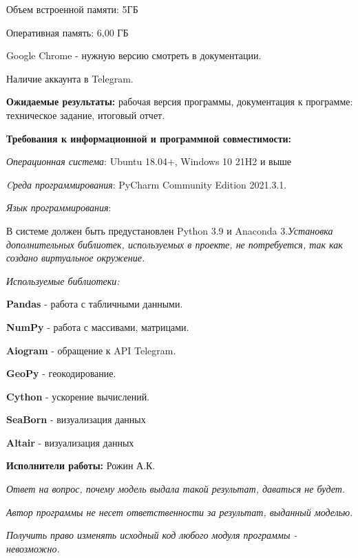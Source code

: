 \documentclass[a4paper,12pt]{article}
\begin{document}
	Объем встроенной памяти: 5ГБ
	
	Оперативная память: 6,00 ГБ
	
	Google Chrome - нужную версию смотреть в документации.
	
	Наличие аккаунта в Telegram.
	
	
	\vspace{5ex}
	\textbf{Ожидаемые результаты:}
	рабочая версия программы, документация к
	программе: техническое задание, итоговый отчет.
	
	\vspace{5ex}
	\textbf{Требования к информационной и программной совместимости:}
	
	\vspace{2ex}
	\textit{Операционная система}: Ubuntu 18.04+, Windows 10 21H2 и выше
	
	\vspace{2ex}
	\textit{Cреда программирования}: PyCharm Community Edition 2021.3.1.
	
	\vspace{2ex}
	\textit{Язык программирования}:
	
	В системе должен быть предустановлен Python 3.9 и Anaconda 3.\textit{Установка дополнительных библиотек, используемых в проекте, не потребуется, так как создано виртуальное окружение.}
	
	\newpage
	\thispagestyle{empty}
	\textit{Используемые библиотеки:}
	
	
	\textbf{Pandas} - работа с табличными данными.
	
	\textbf{NumPy} - работа с массивами, матрицами.
	
	\textbf{Aiogram} - обращение к API Telegram.
	
	\textbf{GeoPy} - геокодирование.
	
	\textbf{Cython} - ускорение вычислений.
	
	\textbf{SeaBorn} - визуализация данных
	
	\textbf{Altair} - визуализация данных
	
	
	\vspace{3ex}
	\textbf{Исполнители работы:} Рожин А.К.
	
	\vspace{5ex}
	\textit{Ответ на вопрос, почему модель выдала такой результат, даваться не будет.} 
	
	\textit{Автор программы не несет ответственности за результат, выданный моделью.}
	
	\textit{Получить право изменять исходный код любого модуля программы - невозможно.}
	
\end{document}
